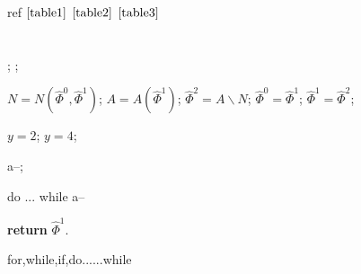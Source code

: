 \documentclass{article}
\begin{document}
     ref $\ref{table1}$ $\ref{table2}$ $\ref{table3}$ 









    \newpage
    \section{ }
     
    \markboth{\text{ }\thesection\text{ } \quad  }{\text{ }\thesection\text{ } \quad  }  

    \begin{algorithm}[!ht]
        \renewcommand{\algorithmicrequire}{\textbf{ }}
        \renewcommand{\algorithmicensure}{\textbf{ }}
        \caption{ }
        \label{power0}
        \begin{algorithmic}[1] %
            \REQUIRE   %
            \ENSURE  %
            
            \STATE  ;
            \STATE  ; 
            
                \STATE $N=N(\widehat{\varPhi}^0,\widehat{\varPhi}^1)$;
                \STATE $A=A(\widehat{\varPhi}^1)$;
                \STATE $\widehat{\varPhi}^2=A\backslash N$;
                \STATE $\widehat{\varPhi}^0=\widehat{\varPhi}^1$;
                \STATE $\widehat{\varPhi}^1=\widehat{\varPhi}^2$;
            \ENDFOR
            
                \STATE $y = 2$;
            \ELSE
                \STATE $y = 4$;
            \ENDIF
            
                \STATE a--;
            \ENDWHILE
            
             do ... while
            \REPEAT
                \STATE a--
            
            \STATE \textbf{return} $\widehat{\varPhi}^1$.
        \end{algorithmic}
    \end{algorithm}

     for,while,if,do......while 
    
\end{document}
